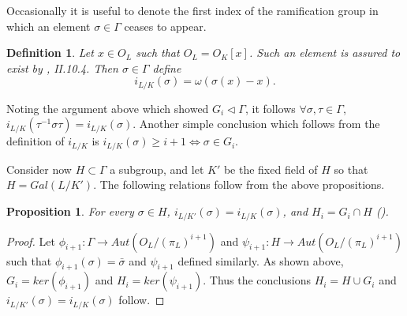 \documentclass[paper=a4, fontsize=11pt]{scrartcl} %
\numberwithin{equation}{section} %
\numberwithin{figure}{section} %
\numberwithin{table}{section} %
\theoremstyle{break}
\newtheorem{defn}{Definition}
\newtheorem{prop}{Proposition}
\begin{document}
Occasionally it is useful to denote the first index of the ramification group in which an element $\sigma\in\Gamma$ ceases to appear. 
\begin{defn}
Let $x\in O_L$ such that $O_L=O_K[x]$. Such an element is assured to exist by \cite{Neukirch}, II.10.4. Then $\sigma\in\Gamma$ define
$$
i_{L/K}(\sigma) = \omega(\sigma(x)-x).
$$
\end{defn}
Noting the argument above which showed $G_i \triangleleft \Gamma$, it follows $\forall \sigma,\tau \in \Gamma$, $i_{L/K}(\tau^{-1}\sigma \tau) = i_{L/K}(\sigma)$. Another simple conclusion which follows from the definition of $i_{L/K}$ is $i_{L/K}(\sigma)\geq i+1 \iff \sigma\in G_i$.

Consider now $H\subset\Gamma$ a subgroup, and let $K'$ be the fixed field of $H$ so that $H=Gal(L/K')$. The following relations follow from the above propositions.
\begin{prop}
For every $\sigma\in H$, $i_{L/K'}(\sigma)=i_{L/K}(\sigma)$, and $H_i=G_i \cap H$ (\cite{Serre}).
\end{prop}
\begin{proof}
Let $\phi_{i+1}:\Gamma \to Aut(O_L/(\pi_L)^{i+1})$ and $\psi_{i+1}:H \to Aut(O_L/(\pi_L)^{i+1})$ such that $\phi_{i+1}(\sigma)=\bar{\sigma}$ and $\psi_{i+1}$ defined similarly. As shown above, $G_i = ker(\phi_{i+1})$ and $H_i = ker(\psi_{i+1})$. Thus the conclusions $H_i = H\cup G_i$ and $i_{L/K'}(\sigma)=i_{L/K}(\sigma)$ follow.
\end{proof}
\end{document}
